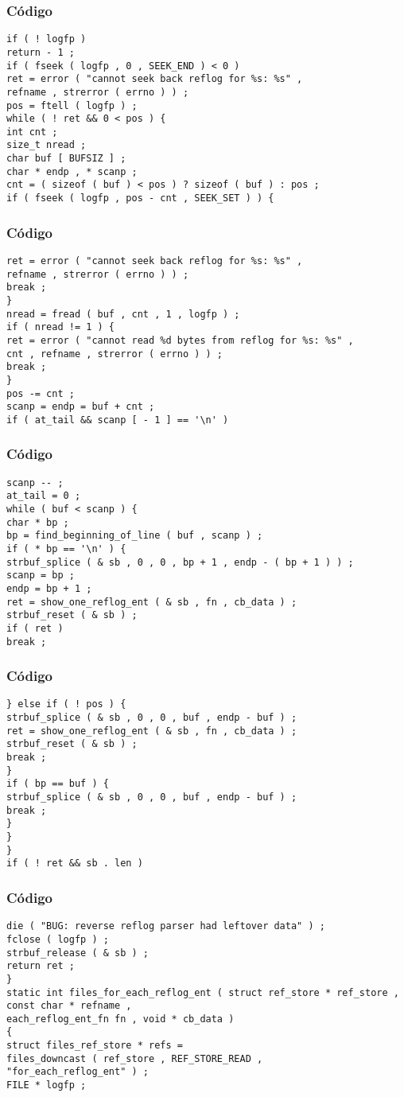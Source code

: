 \documentclass{beamer}
\begin{document}
\begin{frame}[fragile]
\frametitle{C\'odigo}
\begin{verbatim}
if ( ! logfp ) 
return - 1 ; 
if ( fseek ( logfp , 0 , SEEK_END ) < 0 ) 
ret = error ( "cannot seek back reflog for %s: %s" , 
refname , strerror ( errno ) ) ; 
pos = ftell ( logfp ) ; 
while ( ! ret && 0 < pos ) { 
int cnt ; 
size_t nread ; 
char buf [ BUFSIZ ] ; 
char * endp , * scanp ; 
cnt = ( sizeof ( buf ) < pos ) ? sizeof ( buf ) : pos ; 
if ( fseek ( logfp , pos - cnt , SEEK_SET ) ) { 
\end{verbatim}
\end{frame}
\begin{frame}[fragile]
\frametitle{C\'odigo}
\begin{verbatim}
ret = error ( "cannot seek back reflog for %s: %s" , 
refname , strerror ( errno ) ) ; 
break ; 
} 
nread = fread ( buf , cnt , 1 , logfp ) ; 
if ( nread != 1 ) { 
ret = error ( "cannot read %d bytes from reflog for %s: %s" , 
cnt , refname , strerror ( errno ) ) ; 
break ; 
} 
pos -= cnt ; 
scanp = endp = buf + cnt ; 
if ( at_tail && scanp [ - 1 ] == '\n' ) 
\end{verbatim}
\end{frame}
\begin{frame}[fragile]
\frametitle{C\'odigo}
\begin{verbatim}
scanp -- ; 
at_tail = 0 ; 
while ( buf < scanp ) { 
char * bp ; 
bp = find_beginning_of_line ( buf , scanp ) ; 
if ( * bp == '\n' ) { 
strbuf_splice ( & sb , 0 , 0 , bp + 1 , endp - ( bp + 1 ) ) ; 
scanp = bp ; 
endp = bp + 1 ; 
ret = show_one_reflog_ent ( & sb , fn , cb_data ) ; 
strbuf_reset ( & sb ) ; 
if ( ret ) 
break ; 
\end{verbatim}
\end{frame}
\begin{frame}[fragile]
\frametitle{C\'odigo}
\begin{verbatim}
} else if ( ! pos ) { 
strbuf_splice ( & sb , 0 , 0 , buf , endp - buf ) ; 
ret = show_one_reflog_ent ( & sb , fn , cb_data ) ; 
strbuf_reset ( & sb ) ; 
break ; 
} 
if ( bp == buf ) { 
strbuf_splice ( & sb , 0 , 0 , buf , endp - buf ) ; 
break ; 
} 
} 
} 
if ( ! ret && sb . len ) 
\end{verbatim}
\end{frame}
\begin{frame}[fragile]
\frametitle{C\'odigo}
\begin{verbatim}
die ( "BUG: reverse reflog parser had leftover data" ) ; 
fclose ( logfp ) ; 
strbuf_release ( & sb ) ; 
return ret ; 
} 
static int files_for_each_reflog_ent ( struct ref_store * ref_store , 
const char * refname , 
each_reflog_ent_fn fn , void * cb_data ) 
{ 
struct files_ref_store * refs = 
files_downcast ( ref_store , REF_STORE_READ , 
"for_each_reflog_ent" ) ; 
FILE * logfp ; 
\end{verbatim}
\end{frame}
\end{document}
